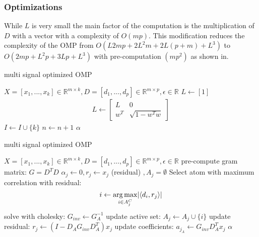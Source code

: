 \subsubsection*{Optimizations}
While $L$ is very small the main factor of the computation is
the multiplication of $D$ with a vector with a complexity of $O(mp)$. 
This modification reduces the complexity of the OMP from $O\left(L2mp + 2L^2m +
2L(p+m) + L^3\right)$ to $O\left(2mp + L^2p + 3Lp + L^3\right)$ 
with pre-computation $\left(mp^2\right)$ as shown in\cite{Rubinstein2008}. 


\begin{algorithm}
\caption{multi signal optimized OMP}
\label{alg:batchOMP}
\begin{algorithmic}[1]
\REQUIRE $X =[x_1,...,x_k]  \in \mathbb{R}^{m \times k}, D  =[d_1,...,d_p]  \in
\mathbb{R}^{m\times p}, \epsilon \in \mathbb{R}$
\STATE $L\gets[1]$
\STATE
{}
\STATE
\begin{align}
L \gets \left[
\begin{array}{ccc}
L & 0\\
w^T & \sqrt{1-w^Tw}
\end{array}
\right]
\end{align}
\ENDIF
\STATE $I \gets I \cup \{ k\}$
\STATE
\STATE $n \gets n+1$
\ENDWHILE
\RETURN $\alpha$
\end{algorithmic}
\end{algorithm}

\begin{algorithm}
\caption{multi signal optimized OMP}
\label{alg:batchOMP}
\begin{algorithmic}[1]
\REQUIRE $X =[x_1,...,x_k]  \in \mathbb{R}^{m \times k}, D  =[d_1,...,d_p]  \in \mathbb{R}^{m\times p}, \epsilon \in \mathbb{R}$
\STATE pre-compute gram matrix: $G=D^TD$
\STATE $\alpha_j \gets 0, r_j \gets x_j $ (residual) $, A_j=\emptyset$
\STATE Select atom with maximum correlation with residual: 
\begin{equation*}
i \gets \operatorname*{arg\,max}_{i \in A_j^C} \lvert \left<d_i,r_j\right> \rvert
\end{equation*}
\STATE solve with cholesky: $G_{inv} \gets G_A^{-1}$
\STATE update active set: $A_j \gets A_j \cup \{i\} $
\STATE update residual: $r_j \gets \left(I-D_AG_{inv}D_A^T \right)x_j$
\STATE update coefficients: $a_{j_A} \gets G_{inv} D_A^T x_j $
\ENDFOR 
\ENDFOR 
\RETURN $\alpha$
\end{algorithmic}
\end{algorithm}


